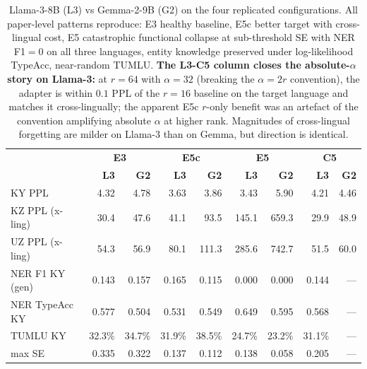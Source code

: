\documentclass[11pt]{article}
\begin{document}
\begin{table}[!htbp]
\centering
\small
\begin{tabular}{lrr|rr|rr|rr}
\toprule
& \multicolumn{2}{c|}{\textbf{E3}} & \multicolumn{2}{c|}{\textbf{E5c}} & \multicolumn{2}{c|}{\textbf{E5}} & \multicolumn{2}{c}{\textbf{C5}} \\
& \textbf{L3} & \textbf{G2} & \textbf{L3} & \textbf{G2} & \textbf{L3} & \textbf{G2} & \textbf{L3} & \textbf{G2} \\
\midrule
KY PPL          & 4.32   & 4.78   & 3.63   & 3.86   & 3.43   & 5.90   & 4.21   & 4.46   \\
KZ PPL (x-ling) & 30.4   & 47.6   & 41.1   & 93.5   & 145.1  & 659.3  & 29.9   & 48.9   \\
UZ PPL (x-ling) & 54.3   & 56.9   & 80.1   & 111.3  & 285.6  & 742.7  & 51.5   & 60.0   \\
NER F1 KY (gen) & 0.143  & 0.157  & 0.165  & 0.115  & 0.000  & 0.000  & 0.144  & ---    \\
NER TypeAcc KY  & 0.577  & 0.504  & 0.531  & 0.549  & 0.649  & 0.595  & 0.568  & ---    \\
TUMLU KY        & 32.3\% & 34.7\% & 31.9\% & 38.5\% & 24.7\% & 23.2\% & 31.1\% & ---    \\
max SE          & 0.335  & 0.322  & 0.137  & 0.112  & 0.138  & 0.058  & 0.205  & ---    \\
\bottomrule
\end{tabular}
\caption{Llama-3-8B (L3) vs Gemma-2-9B (G2) on the four replicated configurations. All paper-level patterns reproduce: E3 healthy baseline, E5c better target with cross-lingual cost, E5 catastrophic functional collapse at sub-threshold SE with NER F1$=0$ on all three languages, entity knowledge preserved under log-likelihood TypeAcc, near-random TUMLU. \textbf{The L3-C5 column closes the absolute-$\alpha$ story on Llama-3:} at $r{=}64$ with $\alpha{=}32$ (breaking the $\alpha{=}2r$ convention), the adapter is within $0.1$ PPL of the $r{=}16$ baseline on the target language and matches it cross-lingually; the apparent E5c $r$-only benefit was an artefact of the convention amplifying absolute $\alpha$ at higher rank. Magnitudes of cross-lingual forgetting are milder on Llama-3 than on Gemma, but direction is identical.}
\label{tab:llama3}
\end{table}
\end{document}
